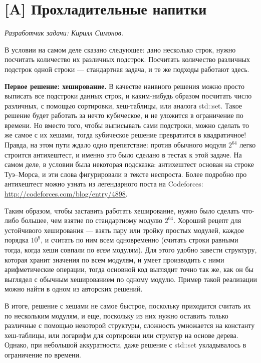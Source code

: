 \documentclass[12pt]{article}
\theoremstyle{definition}
\begin{document}
\pagebreak

\section{[A] Прохладительные напитки}
\textit{Разработчик задачи: Кирилл Симонов.}

В условии на самом деле сказано следующее: дано несколько строк, нужно посчитать
количество их различных подстрок. Посчитать количество различных подстрок одной строки
--- стандартная задача, и те же подходы работают здесь.

\textbf{Первое решение: хеширование.} В качестве наивного решения можно просто выписать все подстроки данных строк, и каким-нибудь образом посчитать число различных,
с помощью сортировки, хеш-таблицы, или аналога std::set. Такое решение будет работать за
нечто кубическое, и не уложится в ограничение по времени. Но вместо того, чтобы
выписывать сами подстроки, можно сделать то же самое с их хешами, тогда кубическое
решение превратится в квадратичное! Правда, на этом пути ждало одно препятствие:
против обычного модуля $2^{64}$ легко строится антихештест, и именно это
было сделано в тестах к этой задаче. На самом деле, в условии была некоторая
подсказка: антихештест основан на строке Туэ--Морса, и эти слова
фигурировали в тексте неспроста. Более подробно про антихештест можно
узнать из легендарного поста на Codeforces: \url{http://codeforces.com/blog/entry/4898}.

Таким образом, чтобы заставить работать хеширование, нужно было сделать что-либо
большее, чем взятие по стандартному модулю $2^{64}$. Хороший рецепт
для устойчивого хеширования --- взять пару или тройку простых модулей, каждое
порядка $10^9$, и считать по ним всем одновременно (считать строки равными тогда,
когда хеши совпали по \emph{всем} модулям). Для этого удобно завести структуру,
которая хранит значения по всем модулям, и умеет производить с ними арифметические
операции, тогда основной код выглядит точно так же, как он бы выглядел с обычным
хешированием по одному модулю. Пример такой реализации можно найти в одном из авторских решений.

В итоге, решение с хешами не самое быстрое, поскольку приходится считать их по нескольким
модулям, и еще, поскольку из них нужно оставить только различные с помощью некоторой
структуры, сложность умножается на константу хеш-таблицы, или логарифм для сортировки или
структур на основе дерева. Однако, при небольшой аккуратности, даже решение с std::set
укладывалось в ограничение по времени.
\end{document}
